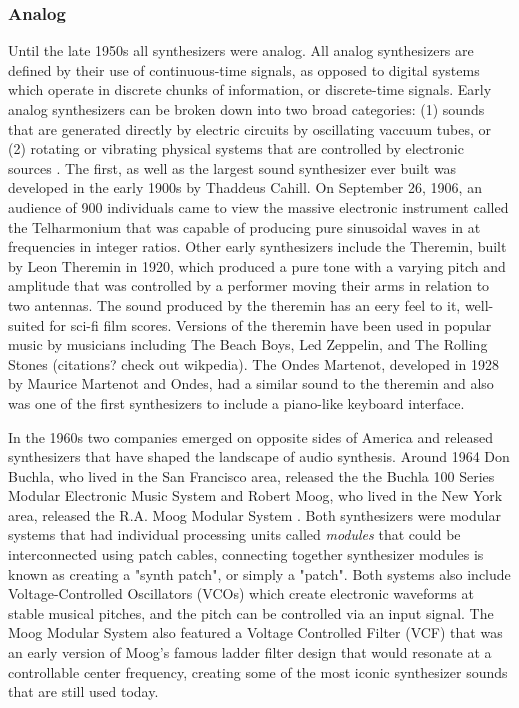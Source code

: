 \subsubsection{Analog}
Until the late 1950s all synthesizers were analog. All analog synthesizers are defined by their use of continuous-time signals, as opposed to digital systems which operate in discrete chunks of information, or discrete-time signals. Early analog synthesizers can be broken down into two broad categories: (1) sounds that are generated directly by electric circuits by oscillating vaccuum tubes, or (2) rotating or vibrating physical systems that are controlled by electronic sources \cite{roads1996computer}. The first, as well as the largest sound synthesizer ever built was developed in the early 1900s by Thaddeus Cahill. On September 26, 1906, an audience of 900 individuals came to view the massive electronic instrument called the Telharmonium that was capable of producing pure sinusoidal waves in at frequencies in integer ratios. Other early synthesizers include the Theremin, built by Leon Theremin in 1920, which produced a pure tone with a varying pitch and amplitude that was controlled by a performer moving their arms in relation to two antennas. The sound produced by the theremin has an eery feel to it, well-suited for sci-fi film scores. Versions of the theremin have been used in popular music by musicians including The Beach Boys, Led Zeppelin, and The Rolling Stones (citations? check out wikpedia).  The Ondes Martenot, developed in 1928 by Maurice Martenot and Ondes, had a similar sound to the theremin and also was one of the first synthesizers to include a piano-like keyboard interface.

In the 1960s two companies emerged on opposite sides of America and released synthesizers that have shaped the landscape of audio synthesis. Around 1964 Don Buchla, who lived in the San Francisco area, released the the Buchla 100 Series Modular Electronic Music System and Robert Moog, who lived in the New York area, released the R.A. Moog Modular System \cite{mcguire2015musical}. Both synthesizers were modular systems that had individual processing units called \textit{modules} that could be interconnected using patch cables, connecting together synthesizer modules is known as creating a "synth patch", or simply a "patch". Both systems also include Voltage-Controlled Oscillators (VCOs) which create electronic waveforms at stable musical pitches, and the pitch can be controlled via an input signal. The Moog Modular System also featured a Voltage Controlled Filter (VCF) that was an early version of Moog's famous ladder filter design that would resonate at a controllable center frequency, creating some of the most iconic synthesizer sounds that are still used today.

